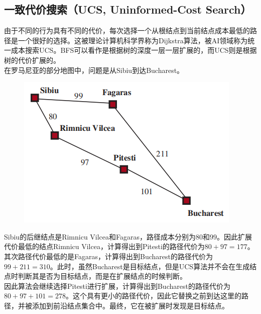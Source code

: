 \subsection{一致代价搜索（UCS, Uninformed-Cost Search）}

由于不同的行为具有不同的代价，每次选择一个从根结点到当前结点成本最低的路径是一个很好的选择。这被理论计算机科学界称为Dijkstra算法，被AI领域称为统一成本搜索UCS。BFS可以看作是根据树的深度一层一层扩展的，而UCS则是根据树的代价扩展的。\\

在罗马尼亚的部分地图中，问题是从Sibiu到达Bucharest。\\

\begin{figure}[H]
    \centering
    \includegraphics{img/C1/1-4/3.png}
\end{figure}

Sibiu的后继结点是Rimnicu Vilcea和Fagaras，路径成本分别为$ 80 $和$ 99 $。因此扩展代价最低的结点Rimnicu Vilcea，计算得出到Pitesti的路径代价为$ 80 + 97 = 177 $。\\

其次路径代价最低的是Fagaras，计算得出到Bucharest的路径代价为$ 99 + 211 = 310 $。此时，虽然Bucharest是目标结点，但是UCS算法并不会在生成结点时判断其是否为目标结点，而是在扩展结点的时候判断。\\

因此算法会继续选择Pitesti进行扩展，计算得出到Bucharest的路径代价为$ 80 + 97 + 101 = 278 $。这个具有更小的路径代价，因此它替换之前到达这里的路径，并被添加到前沿结点集合中。最终，它在被扩展时发现是目标结点。\\

